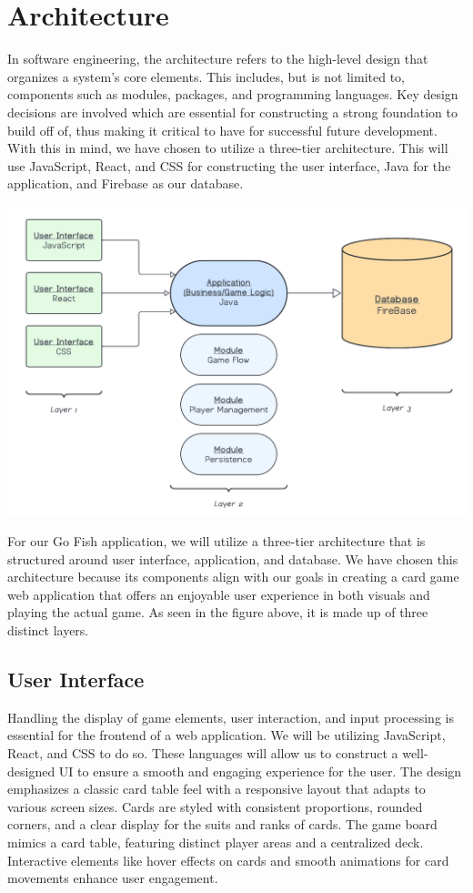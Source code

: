 \section{Architecture}
In software engineering, the architecture refers to the high-level design that organizes a system's core elements. This includes, but is not limited to, components such as modules, packages, and programming languages. Key design decisions are involved which are essential for constructing a strong foundation to build off of, thus making it critical to have for successful future development. With this in mind, we have chosen to utilize a three-tier architecture. This will use JavaScript, React, and CSS for constructing the user interface, Java for the application, and Firebase as our database.

\begin{center}
    \includegraphics[scale=0.3]{CS482 Assignment 2 Architecture FINAL.png}
\end{center}

For our Go Fish application, we will utilize a three-tier architecture that is structured around user interface, application, and database. We have chosen this architecture because its components align with our goals in creating a card game web application that offers an enjoyable user experience in both visuals and playing the actual game. As seen in the figure above, it is made up of three distinct layers.

\subsection{User Interface}
Handling the display of game elements, user interaction, and input processing is essential for the frontend of a web application. We will be utilizing JavaScript, React, and CSS to do so. These languages will allow us to construct a well-designed UI to ensure a smooth and engaging experience for the user. The design emphasizes a classic card table feel with a responsive layout that adapts to various screen sizes. Cards are styled with consistent proportions, rounded corners, and a clear display for the suits and ranks of cards. The game board mimics a card table, featuring distinct player areas and a centralized deck. Interactive elements like hover effects on cards and smooth animations for card movements enhance user engagement.

